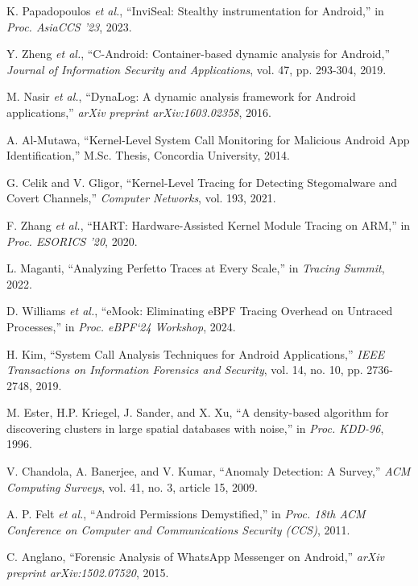 \documentclass[a4paper,12pt]{report}
\begin{document}
\begin{thebibliography}{99}
K. Papadopoulos \emph{et al.}, “InviSeal: Stealthy instrumentation for Android,” in \emph{Proc. AsiaCCS '23}, 2023.

Y. Zheng \emph{et al.}, “C-Android: Container-based dynamic analysis for Android,” \emph{Journal of Information Security and Applications}, vol. 47, pp. 293-304, 2019.

M. Nasir \emph{et al.}, “DynaLog: A dynamic analysis framework for Android applications,” \emph{arXiv preprint arXiv:1603.02358}, 2016.





A. Al-Mutawa, “Kernel-Level System Call Monitoring for Malicious Android App Identification,” M.Sc. Thesis, Concordia University, 2014.

G. Celik and V. Gligor, “Kernel-Level Tracing for Detecting Stegomalware and Covert Channels,” \emph{Computer Networks}, vol. 193, 2021.

F. Zhang \emph{et al.}, “HART: Hardware-Assisted Kernel Module Tracing on ARM,” in \emph{Proc. ESORICS '20}, 2020.

L. Maganti, “Analyzing Perfetto Traces at Every Scale,” in \emph{Tracing Summit}, 2022.

D. Williams \emph{et al.}, “eMook: Eliminating eBPF Tracing Overhead on Untraced Processes,” in \emph{Proc. eBPF‘24 Workshop}, 2024.

H. Kim, “System Call Analysis Techniques for Android Applications,” \emph{IEEE Transactions on Information Forensics and Security}, vol. 14, no. 10, pp. 2736-2748, 2019.

M. Ester, H.P. Kriegel, J. Sander, and X. Xu, “A density-based algorithm for discovering clusters in large spatial databases with noise,” in \emph{Proc. KDD-96}, 1996.

V. Chandola, A. Banerjee, and V. Kumar, “Anomaly Detection: A Survey,” \emph{ACM Computing Surveys}, vol. 41, no. 3, article 15, 2009.

A. P. Felt \emph{et al.}, “Android Permissions Demystified,” in \emph{Proc. 18th ACM Conference on Computer and Communications Security (CCS)}, 2011.

C. Anglano, “Forensic Analysis of WhatsApp Messenger on Android,” \emph{arXiv preprint arXiv:1502.07520}, 2015.


\end{thebibliography}
\end{document}
